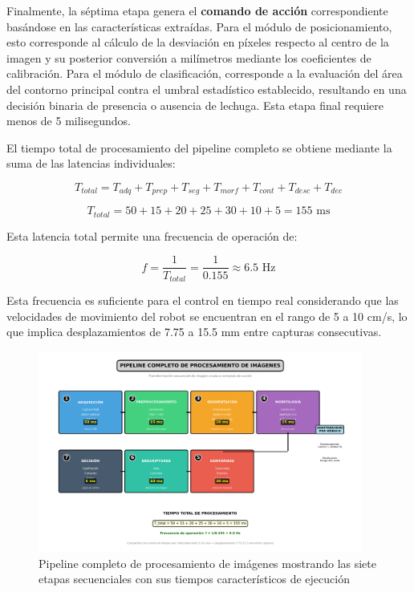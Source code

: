 Finalmente, la séptima etapa genera el \textbf{comando de acción} correspondiente basándose en las características extraídas. Para el módulo de posicionamiento, esto corresponde al cálculo de la desviación en píxeles respecto al centro de la imagen y su posterior conversión a milímetros mediante los coeficientes de calibración. Para el módulo de clasificación, corresponde a la evaluación del área del contorno principal contra el umbral estadístico establecido, resultando en una decisión binaria de presencia o ausencia de lechuga. Esta etapa final requiere menos de 5 milisegundos.

El tiempo total de procesamiento del pipeline completo se obtiene mediante la suma de las latencias individuales:

\begin{equation}
T_{total} = T_{adq} + T_{prep} + T_{seg} + T_{morf} + T_{cont} + T_{desc} + T_{dec}
\end{equation}

\begin{equation}
T_{total} = 50 + 15 + 20 + 25 + 30 + 10 + 5 = 155 \text{ ms}
\end{equation}

Esta latencia total permite una frecuencia de operación de:

\begin{equation}
f = \frac{1}{T_{total}} = \frac{1}{0.155} \approx 6.5 \text{ Hz}
\end{equation}

Esta frecuencia es suficiente para el control en tiempo real considerando que las velocidades de movimiento del robot se encuentran en el rango de 5 a 10 cm/s, lo que implica desplazamientos de 7.75 a 15.5 mm entre capturas consecutivas.

\begin{figure}[h]
\centering
\includegraphics[width=0.95\textwidth]{imagenes/pipeline_procesamiento_completo.png}
\caption{Pipeline completo de procesamiento de imágenes mostrando las siete etapas secuenciales con sus tiempos característicos de ejecución}
\label{fig:pipeline_completo}
\end{figure}

